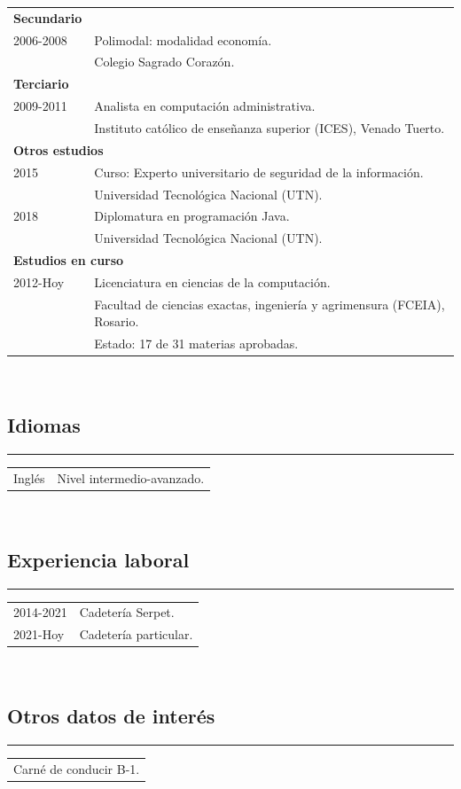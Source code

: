 \documentclass[12pt]{article}
\begin{document}
\begin{tabular}{l l}
  \multicolumn{1}{l}{\textbf{Secundario}}\\
  2006-2008&Polimodal: modalidad economía.\\
           &\small{Colegio Sagrado Corazón.}\\
  \multicolumn{2}{l}{\textbf{Terciario}}\\
  2009-2011&Analista en computación administrativa.\\
           &\small{Instituto católico de enseñanza superior (ICES), Venado Tuerto.}\\
  \multicolumn{2}{l}{\textbf{Otros estudios}}\\
  2015&Curso: Experto universitario de seguridad de la información.\\
           &\small{Universidad Tecnológica Nacional (UTN).}\\
  2018&Diplomatura en programación Java.\\
           &\small{Universidad Tecnológica Nacional (UTN).}\\
  \multicolumn{2}{l}{\textbf{Estudios en curso}}\\
  2012-Hoy&Licenciatura en ciencias de la computación.\\
           &\small{Facultad de ciencias exactas, ingeniería y agrimensura (FCEIA), Rosario.}\\
           &\small{Estado: 17 de 31 materias aprobadas.}\\
\end{tabular}\\
{\color{blue}\subsection*{Idiomas}}
\hrule
\begin{tabular}{l l}
  Inglés&Nivel intermedio-avanzado.\\
\end{tabular}\\
{\color{blue}\subsection*{Experiencia laboral}}
\hrule
\begin{tabular}{l l}
  2014-2021&Cadetería Serpet.\\
  2021-Hoy&Cadetería particular.
\end{tabular}\\
{\color{blue}\subsection*{Otros datos de interés}}
\hrule
\begin{tabular}{l}
  Carné de conducir B-1.\\
\end{tabular}
\end{document}
